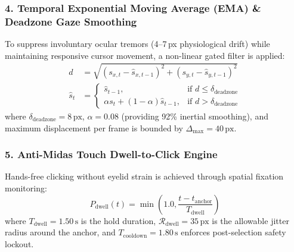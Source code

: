 \documentclass[11pt,a4paper]{article}
\begin{document}
\subsubsection{4. Temporal Exponential Moving Average (EMA) \& Deadzone Gaze Smoothing}
To suppress involuntary ocular tremors (4--7\,px physiological drift) while maintaining responsive cursor movement, a non-linear gated filter is applied:
\begin{align}
d &= \sqrt{(s_{x, t} - \hat{s}_{x, t-1})^2 + (s_{y, t} - \hat{s}_{y, t-1})^2} \\
\hat{s}_t &= 
\begin{cases}
\hat{s}_{t-1}, & \text{if } d \le \delta_{\text{deadzone}} \\
\alpha s_t + (1 - \alpha) \hat{s}_{t-1}, & \text{if } d > \delta_{\text{deadzone}}
\end{cases}
\end{align}
where $\delta_{\text{deadzone}} = 8\,\text{px}$, $\alpha = 0.08$ (providing 92\% inertial smoothing), and maximum displacement per frame is bounded by $\Delta_{\max} = 40\,\text{px}$.

\subsubsection{5. Anti-Midas Touch Dwell-to-Click Engine}
Hands-free clicking without eyelid strain is achieved through spatial fixation monitoring:
\begin{equation}
P_{\text{dwell}}(t) = \min\left(1.0, \frac{t - t_{\text{anchor}}}{T_{\text{dwell}}}\right)
\end{equation}
where $T_{\text{dwell}} = 1.50\,\text{s}$ is the hold duration, $\mathcal{R}_{\text{dwell}} = 35\,\text{px}$ is the allowable jitter radius around the anchor, and $T_{\text{cooldown}} = 1.80\,\text{s}$ enforces post-selection safety lockout.
\end{document}
